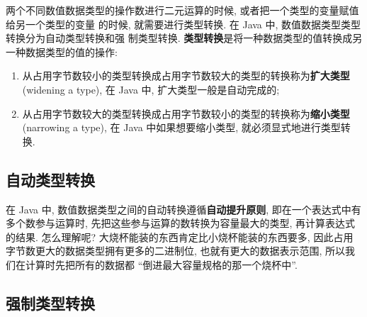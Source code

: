 \documentclass[10pt,UTF8]{book} %
\begin{document}
两个不同数值数据类型的操作数进行二元运算的时候, 或者把一个类型的变量赋值给另一个类型的变量
的时候, 就需要进行类型转换. 在 Java 中, 数值数据类型类型转换分为自动类型转换和强
制类型转换. \textbf{类型转换}是将一种数据类型的值转换成另一种数据类型的值的操作:
\begin{enumerate}[label=(\arabic*), itemsep=0pt]
    \item 从占用字节数较小的类型转换成占用字节数较大的类型的转换称为\textbf{扩大类型}
    (widening a type), 在 Java 中, 扩大类型一般是自动完成的;
    \item 从占用字节数较大的类型转换成占用字节数较小的类型的转换称为\textbf{缩小类型}
    (narrowing a type), 在 Java 中如果想要缩小类型, 就必须显式地进行类型转换.
\end{enumerate}

\subsection{自动类型转换}

在 Java 中, 数值数据类型之间的自动转换遵循\textbf{自动提升原则}, 
即在一个表达式中有多个数参与运算时, 先把这些参与运算的数转换为容量最大的类型, 
再计算表达式的结果. 怎么理解呢? 大烧杯能装的东西肯定比小烧杯能装的东西要多,
因此占用字节数更大的数据类型拥有更多的二进制位, 也就有更大的数据表示范围,
所以我们在计算时先把所有的数据都 “倒进最大容量规格的那一个烧杯中”.

\subsection{强制类型转换}


\end{document}
